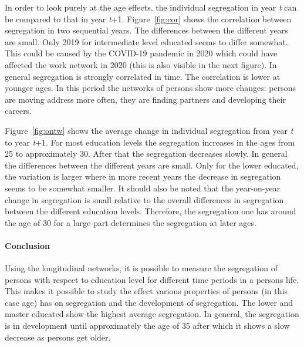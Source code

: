 \documentclass[a4paper,12pt]{article}
\begin{document}
In order to look purely at the age effects, the individual segregation in year \textit{t} can be compared to that in year \textit{t}+1. Figure~\ref{fig:cor} shows the correlation between segregation in two sequential years. The differences between the different years are small. Only 2019 for intermediate level educated seems to differ somewhat. This could be caused by the COVID-19 pandemic in 2020 which could have affected the work network in 2020 (this is also visible in the next figure). In general segregation is strongly correlated in time. The correlation is lower at younger ages. In this period the networks of persons show more changes: persons are moving address more often, they are finding partners and developing their careers. 

Figure~\ref{fig:ontw} shows the average change in individual segregation from year \textit{t} to year \textit{t}+1. For most education levels the segregation increases in the ages from 25 to approximately 30. After that the segregation decreases slowly. In general the differences between the different years are small. Only for the lower educated, the variation is larger where in more recent years the decrease in segregation seems to be somewhat smaller. It should also be noted that the year-on-year change in segregation is small relative to the overall differences in segregation between the different education levels. Therefore, the segregation one has around the age of 30 for a large part determines the segregation at later ages.

\paragraph{Conclusion} 
Using the longitudinal networks, it is possible to measure the segregation of persons with respect to education level for different time periods in a persons life. This makes it possible to study the effect various properties of persons (in this case age) has on segregation and the development of segregation. The lower and master educated show the highest average segregation. In general, the segregation is in development until approximately the age of 35 after which it shows a slow decrease as persons get older. 





\newpage
\end{document}
